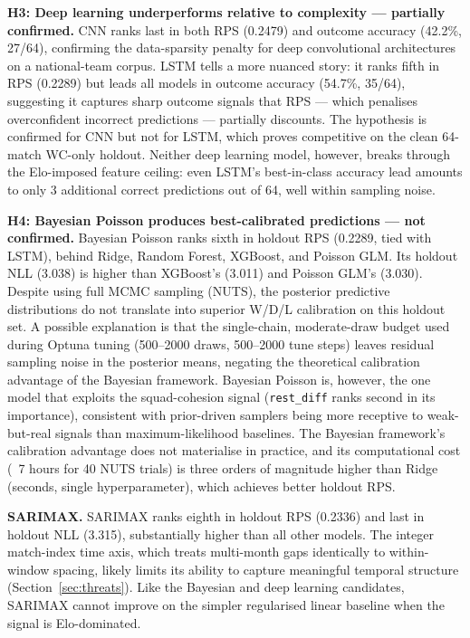 \documentclass[conference]{IEEEtran}
\begin{document}
\textbf{H3: Deep learning underperforms relative to complexity ---
partially confirmed.}
CNN ranks last in both RPS (0.2479) and outcome accuracy (42.2\%, 27/64),
confirming the data-sparsity penalty for deep convolutional architectures
on a national-team corpus.  LSTM tells a more nuanced story: it ranks fifth
in RPS (0.2289) but leads all models in outcome accuracy (54.7\%, 35/64),
suggesting it captures sharp outcome signals that RPS --- which penalises
overconfident incorrect predictions --- partially discounts.  The hypothesis
is confirmed for CNN but not for LSTM, which proves competitive on the
clean 64-match WC-only holdout.  Neither deep learning model, however,
breaks through the Elo-imposed feature ceiling: even LSTM's best-in-class
accuracy lead amounts to only 3 additional correct predictions out of 64,
well within sampling noise.

\textbf{H4: Bayesian Poisson produces best-calibrated predictions --- not
confirmed.}
Bayesian Poisson ranks sixth in holdout RPS (0.2289, tied with LSTM),
behind Ridge, Random Forest, XGBoost, and Poisson GLM.  Its holdout NLL
(3.038) is higher than XGBoost's (3.011) and Poisson GLM's (3.030).
Despite using full MCMC sampling (NUTS), the posterior predictive
distributions do not translate into superior W/D/L calibration on this
holdout set.  A possible explanation is that the single-chain, moderate-draw
budget used during Optuna tuning (500--2000 draws, 500--2000 tune steps)
leaves residual sampling noise in the posterior means, negating the
theoretical calibration advantage of the Bayesian framework.  Bayesian Poisson is, however, the one model that exploits the
squad-cohesion signal (\texttt{rest\_diff} ranks second in its
importance), consistent with prior-driven samplers being more receptive to
weak-but-real signals than maximum-likelihood baselines.  The Bayesian framework's calibration advantage
does not materialise in practice, and its computational cost (~7 hours for
40 NUTS trials) is three orders of magnitude higher than Ridge (seconds,
single hyperparameter), which achieves better holdout RPS.

\textbf{SARIMAX.}
SARIMAX ranks eighth in holdout RPS (0.2336) and last in holdout NLL
(3.315), substantially higher than all other models.  The integer
match-index time axis, which treats multi-month gaps identically to
within-window spacing, likely limits its ability to capture meaningful
temporal structure (Section~\ref{sec:threats}).  Like the Bayesian and
deep learning candidates, SARIMAX cannot improve on the simpler regularised
linear baseline when the signal is Elo-dominated.
\end{document}
